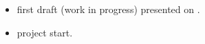 \begin{footnotesize}
\begin{itemize}









\item[2014-08-31] first draft (work in progress) presented on .

\item[2014-02-01] project start.

\end{itemize}
\end{footnotesize}
